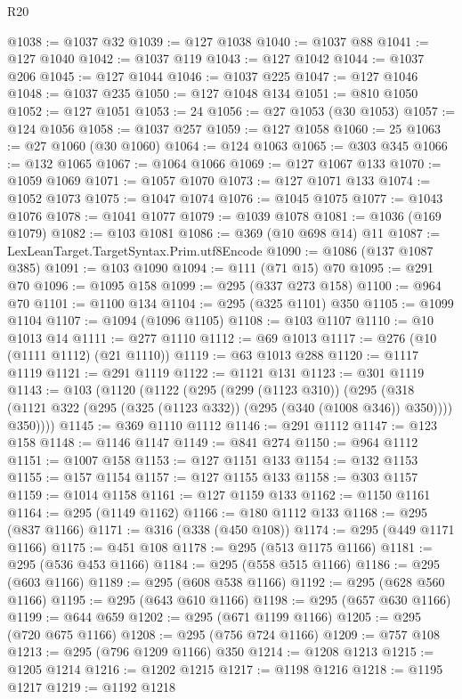 \begin{lexlean}{R20}
\begin{coremodule}
@1038 := @1037 @32
@1039 := @127 @1038
@1040 := @1037 @88
@1041 := @127 @1040
@1042 := @1037 @119
@1043 := @127 @1042
@1044 := @1037 @206
@1045 := @127 @1044
@1046 := @1037 @225
@1047 := @127 @1046
@1048 := @1037 @235
@1050 := @127 @1048 @134
@1051 := @810 @1050
@1052 := @127 @1051
@1053 := 24
@1056 := @27 @1053 (@30 @1053)
@1057 := @124 @1056
@1058 := @1037 @257
@1059 := @127 @1058
@1060 := 25
@1063 := @27 @1060 (@30 @1060)
@1064 := @124 @1063
@1065 := @303 @345
@1066 := @132 @1065
@1067 := @1064 @1066
@1069 := @127 @1067 @133
@1070 := @1059 @1069
@1071 := @1057 @1070
@1073 := @127 @1071 @133
@1074 := @1052 @1073
@1075 := @1047 @1074
@1076 := @1045 @1075
@1077 := @1043 @1076
@1078 := @1041 @1077
@1079 := @1039 @1078
@1081 := @1036 (@169 @1079)
@1082 := @103 @1081
@1086 := @369 (@10 @698 @14) @11
@1087 := LexLeanTarget.TargetSyntax.Prim.utf8Encode
@1090 := @1086 (@137 @1087 @385)
@1091 := @103 @1090
@1094 := @111 (@71 @15) @70
@1095 := @291 @70
@1096 := @1095 @158
@1099 := @295 (@337 @273 @158)
@1100 := @964 @70
@1101 := @1100 @134
@1104 := @295 (@325 @1101) @350
@1105 := @1099 @1104
@1107 := @1094 (@1096 @1105)
@1108 := @103 @1107
@1110 := @10 @1013 @14
@1111 := @277 @1110
@1112 := @69 @1013
@1117 := @276 (@10 (@1111 @1112) (@21 @1110))
@1119 := @63 @1013 @288
@1120 := @1117 @1119
@1121 := @291 @1119
@1122 := @1121 @131
@1123 := @301 @1119
@1143 := @103
    (@1120
      (@1122
        (@295
          (@299 (@1123 @310))
          (@295
            (@318 (@1121 @322 (@295 (@325 (@1123 @332)) (@295 (@340 (@1008 @346)) @350))))
            @350))))
@1145 := @369 @1110 @1112
@1146 := @291 @1112
@1147 := @123 @158
@1148 := @1146 @1147
@1149 := @841 @274
@1150 := @964 @1112
@1151 := @1007 @158
@1153 := @127 @1151 @133
@1154 := @132 @1153
@1155 := @157 @1154
@1157 := @127 @1155 @133
@1158 := @303 @1157
@1159 := @1014 @1158
@1161 := @127 @1159 @133
@1162 := @1150 @1161
@1164 := @295 (@1149 @1162)
@1166 := @180 @1112 @133
@1168 := @295 (@837 @1166)
@1171 := @316 (@338 (@450 @108))
@1174 := @295 (@449 @1171 @1166)
@1175 := @451 @108
@1178 := @295 (@513 @1175 @1166)
@1181 := @295 (@536 @453 @1166)
@1184 := @295 (@558 @515 @1166)
@1186 := @295 (@603 @1166)
@1189 := @295 (@608 @538 @1166)
@1192 := @295 (@628 @560 @1166)
@1195 := @295 (@643 @610 @1166)
@1198 := @295 (@657 @630 @1166)
@1199 := @644 @659
@1202 := @295 (@671 @1199 @1166)
@1205 := @295 (@720 @675 @1166)
@1208 := @295 (@756 @724 @1166)
@1209 := @757 @108
@1213 := @295 (@796 @1209 @1166) @350
@1214 := @1208 @1213
@1215 := @1205 @1214
@1216 := @1202 @1215
@1217 := @1198 @1216
@1218 := @1195 @1217
@1219 := @1192 @1218

\end{coremodule}
\end{lexlean}
